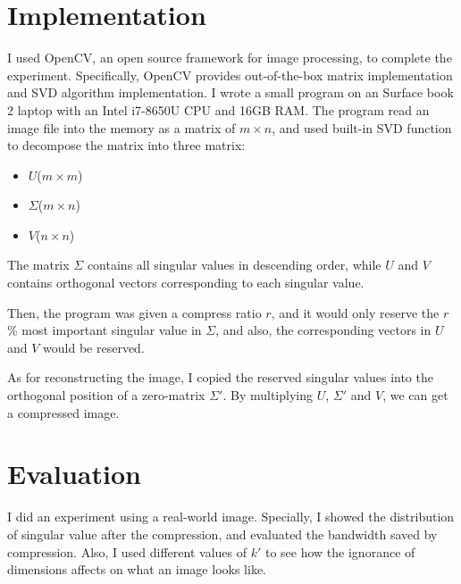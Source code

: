 \documentclass{article}
\begin{document}
    \section{Implementation}
        \par
        I used OpenCV, an open source framework for image processing, to complete the experiment.
        Specifically, OpenCV provides out-of-the-box matrix implementation
        and SVD algorithm implementation.
        I wrote a small program on an Surface book 2 laptop with an Intel i7-8650U CPU and 16GB RAM.
        The program read an image file into the memory as a matrix of $m \times n$,
        and used built-in SVD function to decompose the matrix into three matrix:
        \begin{itemize}
            \item $U$($m \times m$)
            \item $\Sigma$($m \times n$)
            \item $V$($n \times n$)
        \end{itemize}
        The matrix $\Sigma$ contains all singular values in descending order,
        while $U$ and $V$ contains orthogonal vectors corresponding to each singular value.
        \par
        Then, the program was given a compress ratio $r$,
        and it would only reserve the $r$\% most important singular value in $\Sigma$,
        and also, the corresponding vectors in $U$ and $V$ would be reserved.
        \par
        As for reconstructing the image,
        I copied the reserved singular values into the orthogonal position of a zero-matrix $\Sigma'$.
        By multiplying $U$, $\Sigma'$ and $V$, we can get a compressed image.

    \section{Evaluation}
        \par
        I did an experiment using a real-world image.
        Specially, I showed the distribution of singular value after the compression,
        and evaluated the bandwidth saved by compression.
        Also, I used different values of $k'$ to see
        how the ignorance of dimensions affects on what an image looks like.
\end{document}
